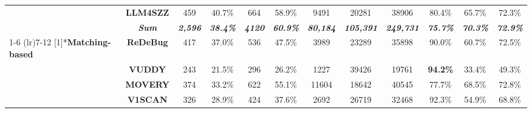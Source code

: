 \begin{table}[htbp]
{\begin{tabular}{lccccccccccc}
    &  \textbf{LLM4SZZ}  & 459   & 40.7\% & 664   & 58.9\% & 9491  & 20281 & 38906 & 80.4\% & 65.7\% & 72.3\% \\
    &  \cellcolor[rgb]{0.89, 0.89, 0.89} \textit{\textbf{Sum}} & \cellcolor[rgb]{0.89, 0.89, 0.89}\textit{\textbf{2,596}} & \cellcolor[rgb]{0.89, 0.89, 0.89}\textit{\textbf{38.4\%}} & \cellcolor[rgb]{0.89, 0.89, 0.89}\textit{\textbf{4120}} & \cellcolor[rgb]{0.89, 0.89, 0.89}\textit{\textbf{60.9\%}} & \cellcolor[rgb]{0.89, 0.89, 0.89}\textit{\textbf{80,184}} & \cellcolor[rgb]{0.89, 0.89, 0.89}\textit{\textbf{105,391}} & \cellcolor[rgb]{0.89, 0.89, 0.89}\textit{\textbf{249,731}} & \cellcolor[rgb]{0.89, 0.89, 0.89}\textit{\textbf{75.7\%}} & \cellcolor[rgb]{0.89, 0.89, 0.89}\textit{\textbf{70.3\%}} & \cellcolor[rgb]{0.89, 0.89, 0.89}\textit{\textbf{72.9\%}} \\
    \cmidrule(lr){1-6} \cmidrule(lr){7-12}
    \multirow{6}[1]{*}{\textbf{Matching-based}} & 
     \textbf{ReDeBug} & 417   & 37.0\% & 536   & 47.5\% & 3989  & 23289 & 35898 & 90.0\% & 60.7\% & 72.5\% \\
    & \cellcolor[rgb]{0.89, 0.89, 0.89} \textbf{VUDDY} & \cellcolor[rgb]{0.89, 0.89, 0.89} 243 & \cellcolor[rgb]{0.89, 0.89, 0.89} 21.5\% & \cellcolor[rgb]{0.89, 0.89, 0.89} 296 & \cellcolor[rgb]{0.89, 0.89, 0.89} 26.2\% & \cellcolor[rgb]{0.89, 0.89, 0.89} 1227 & \cellcolor[rgb]{0.89, 0.89, 0.89} 39426 & \cellcolor[rgb]{0.89, 0.89, 0.89} 19761 & \cellcolor[rgb]{0.89, 0.89, 0.89} \textbf{94.2\%} & \cellcolor[rgb]{0.89, 0.89, 0.89} 33.4\% & \cellcolor[rgb]{0.89, 0.89, 0.89} 49.3\% \\

    & \textbf{MOVERY} & 374   & 33.2\% & 622   & 55.1\% & 11604 & 18642 & 40545 & 77.7\% & 68.5\% & 72.8\% \\
    & \cellcolor[rgb]{0.89, 0.89, 0.89} \textbf{V1SCAN} & \cellcolor[rgb]{0.89, 0.89, 0.89} 326 & \cellcolor[rgb]{0.89, 0.89, 0.89} 28.9\% & \cellcolor[rgb]{0.89, 0.89, 0.89} 424 & \cellcolor[rgb]{0.89, 0.89, 0.89} 37.6\% & \cellcolor[rgb]{0.89, 0.89, 0.89} 2692 & \cellcolor[rgb]{0.89, 0.89, 0.89} 26719 & \cellcolor[rgb]{0.89, 0.89, 0.89} 32468 & \cellcolor[rgb]{0.89, 0.89, 0.89} 92.3\% & \cellcolor[rgb]{0.89, 0.89, 0.89} 54.9\% & \cellcolor[rgb]{0.89, 0.89, 0.89} 68.8\% \\


\end{tabular}}
\end{table}
